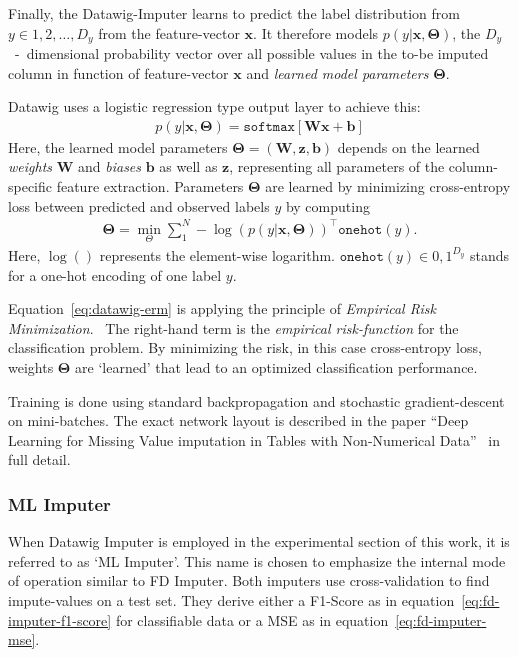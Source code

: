 Finally, the Datawig-Imputer learns to predict the label distribution from \( y \in {1, 2, \dots, D_y} \) from the feature-vector \( \mathbold{x} \).
It therefore models \( p(y|\mathbold{x},\mathbold{\Theta}) \), the \( D_y \)~-~dimensional probability vector over all possible values in the to-be imputed column in function of feature-vector \( \mathbold{x} \) and \emph{learned model parameters} \( \mathbold{\Theta} \).~\cite[p.~2021]{BIE18}

Datawig uses a logistic regression type output layer to achieve this:
\begin{align*}
    p(y|\mathbold{x},\mathbold{\Theta}) = \texttt{softmax}[\mathbold{Wx} + \mathbold{b}]
\end{align*}
Here, the learned model parameters \( \mathbold{\Theta} = (\mathbold{W}, \mathbold{z}, \mathbold{b}) \) depends on the learned \emph{weights} \( \mathbold{W} \) and \emph{biases} \( \mathbold{b} \) as well as \( \mathbold{z} \), representing all parameters of the column-specific feature extraction.
Parameters \( \mathbold{\Theta} \) are learned by minimizing cross-entropy loss between predicted and observed labels \( y \) by computing
\begin{align}\label{eq:datawig-erm}
    \mathbold{\Theta} = \min_{\Theta} \sum\nolimits_{1}^{N} - \log\left(p\left(y|\mathbold{x}, \mathbold{\Theta}\right)\right)^\top \texttt{onehot}(y).
\end{align}
Here, \( \log() \) represents the element-wise logarithm.
\( \texttt{onehot}(y) \in {0, 1}^{D_y}\) stands for a one-hot encoding of one label \( y \).

Equation~\ref{eq:datawig-erm} is applying the principle of \emph{Empirical Risk Minimization}.~\cite[p.~832]{VAP92}
The right-hand term is the \emph{empirical risk-function} for the classification problem.
By minimizing the risk, in this case cross-entropy loss, weights \( \mathbold{\Theta} \) are `learned' that lead to an optimized classification performance.

Training is done using standard backpropagation and stochastic gradient-descent on mini-batches.
The exact network layout is described in the paper ``Deep Learning for Missing Value imputation in Tables with Non-Numerical Data''~\cite[p.~2022]{BIE18} in full detail.

\subsubsection{ML Imputer}
When Datawig Imputer is employed in the experimental section of this work, it is referred to as `ML Imputer'.
This name is chosen to emphasize the internal mode of operation similar to FD Imputer.
Both imputers use cross-validation to find impute-values on a test set.
They derive either a F1-Score as in equation~\ref{eq:fd-imputer-f1-score} for classifiable data or a MSE as in equation~\ref{eq:fd-imputer-mse}.

